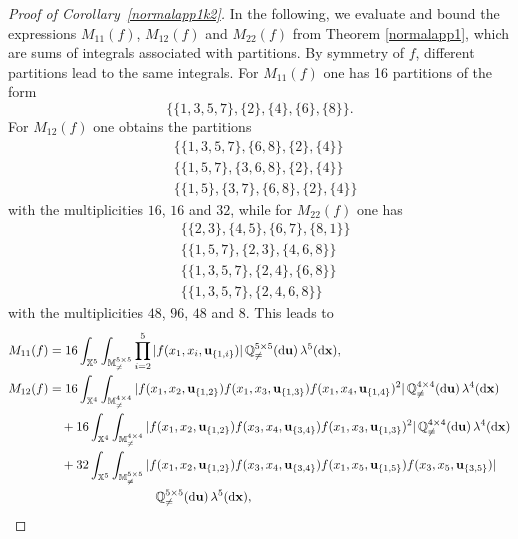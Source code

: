 \documentclass{article}
\theoremstyle{definition}
\numberwithin{equation}{section}
\theoremstyle{remark}
\begin{document}
\begin{proof}[Proof of Corollary~\ref{normalapp1k2}]
In the following, we evaluate and bound the expressions $M_{11}(f)$, $M_{12}(f)$ and $M_{22}(f)$ from Theorem \ref{normalapp1}, which are sums of integrals associated with partitions. By symmetry of $f$, different partitions lead to the same integrals. For $M_{11}(f)$ one has 16 partitions of the form
$$
\big\{ \{1,3,5,7\}, \{2\}, \{4\}, \{6\}, \{8\} \big\}.
$$
For $M_{12}(f)$ one obtains the partitions
\begin{align*}
& \big\{ \{1,3,5,7\}, \{6,8\}, \{2\}, \{4\} \big\} \\
& \big\{ \{1,5,7\}, \{3,6,8\}, \{2\}, \{4\} \big\} \\
& \big\{ \{1,5\}, \{3,7\}, \{6,8\}, \{2\}, \{4\} \big\}
\end{align*}
with the multiplicities $16$, $16$ and $32$, while for $M_{22}(f)$ one has
\begin{align*}
& \big\{ \{2,3\}, \{4,5\}, \{6,7\}, \{8,1\} \big\} \\
& \big\{ \{1,5,7\}, \{2,3\}, \{4,6,8\} \big\} \\
& \big\{ \{1,3,5,7\}, \{2,4\}, \{6,8\} \big\} \\
& \big\{ \{1,3,5,7\}, \{2,4,6,8\} \big\}
\end{align*}
with the multiplicities $48$, $96$, $48$ and $8$. This leads to
\begin{align*}
M_{11}(f) & = 16\int_{\mathbb{X}^5} \int_{\mathbb{M}_{\neq}^{5\times 5}} \prod_{i=2}^5 |f(x_1,x_i,\mathbf{u}_{\{1,i\}})| \, \mathbb{Q}_{\neq}^{5\times 5}(\mathrm{d}\mathbf{u}) \, \lambda^5(\mathrm{d}\mathbf{x}), \allowdisplaybreaks \\
M_{12}(f) & = 16\int_{\mathbb{X}^4} \int_{\mathbb{M}_{\neq}^{4\times 4}} |f(x_1,x_2,\mathbf{u}_{\{1,2\}}) f(x_1,x_3,\mathbf{u}_{\{1,3\}}) f(x_1,x_4,\mathbf{u}_{\{1,4\}})^2| \, \mathbb{Q}_{\neq}^{4\times 4}(\mathrm{d}\mathbf{u}) \, \lambda^4(\mathrm{d}\mathbf{x}) \\
& \quad +16\int_{\mathbb{X}^4} \int_{\mathbb{M}_{\neq}^{4\times 4}} |f(x_1,x_2,\mathbf{u}_{\{1,2\}}) f(x_3,x_4,\mathbf{u}_{\{3,4\}}) f(x_1,x_3,\mathbf{u}_{\{1,3\}})^2| \, \mathbb{Q}_{\neq}^{4\times 4}(\mathrm{d}\mathbf{u}) \, \lambda^4(\mathrm{d}\mathbf{x}) \\
& \quad +32\int_{\mathbb{X}^5} \int_{\mathbb{M}_{\neq}^{5\times 5}} |f(x_1,x_2,\mathbf{u}_{\{1,2\}}) f(x_3,x_4,\mathbf{u}_{\{3,4\}}) f(x_1,x_5,\mathbf{u}_{\{1,5\}})  f(x_3,x_5,\mathbf{u}_{\{3,5\}})| \\
& \hspace{3cm} \mathbb{Q}_{\neq}^{5\times 5}(\mathrm{d}\mathbf{u}) \, \lambda^5(\mathrm{d}\mathbf{x}), \allowdisplaybreaks\\

\end{align*}
\end{proof}
\end{document}
